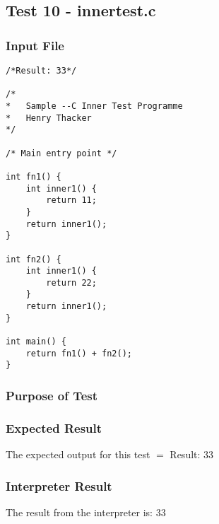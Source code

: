 \subsection{Test 10 - innertest.c}
\subsubsection{Input File}
\begin{lstlisting}[showstringspaces=false,breaklines=true,backgroundcolor=\color{light-gray}, captionpos=b]
/*Result: 33*/

/*
*	Sample --C Inner Test Programme
*	Henry Thacker
*/

/* Main entry point */

int fn1() {
	int inner1() {
		return 11;
	}
	return inner1();
}

int fn2() {
	int inner1() {
		return 22;
	}
	return inner1();
}

int main() {
	return fn1() + fn2();
}
\end{lstlisting}\subsubsection{Purpose of Test}

\subsubsection{Expected Result}
The expected output for this test $=$ Result: 33
\subsubsection{Interpreter Result}
The result from the interpreter is: 33
